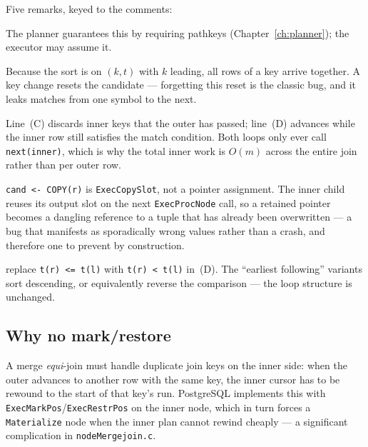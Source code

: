 \documentclass[11pt,a4paper]{report}
\theoremstyle{definition}
\theoremstyle{plain}
\newcommand{\code}[1]{\texttt{\small #1}}
\newcommand{\file}[1]{\texttt{\footnotesize #1}}
\begin{document}
Five remarks, keyed to the comments:

\begin{description}[leftmargin=*,font=\normalfont\bfseries]
\item[(A) Both sides are sorted.] The planner guarantees this by requiring pathkeys
      (Chapter~\ref{ch:planner}); the executor may assume it.
\item[(B) Key groups are contiguous.] Because the sort is on $(k, t)$ with $k$ leading, all
      rows of a key arrive together. A key change resets the candidate --- forgetting this
      reset is the classic bug, and it leaks matches from one symbol to the next.
\item[(C) and (D) The inner cursor never rewinds.] Line~(C) discards inner keys that the
      outer has passed; line~(D) advances while the inner row still satisfies the match
      condition. Both loops only ever call \code{next(inner)}, which is why the total inner
      work is $O(m)$ across the entire join rather than per outer row.
\item[(E) The candidate must be \emph{copied}.] \code{cand <- COPY(r)} is
      \code{ExecCopySlot}, not a pointer assignment. The inner child reuses its output slot
      on the next \code{ExecProcNode} call, so a retained pointer becomes a dangling
      reference to a tuple that has already been overwritten --- a bug that manifests as
      sporadically wrong values rather than a crash, and therefore one to prevent by
      construction.
\item[Strict operators] replace \code{t(r) <= t(l)} with \code{t(r) < t(l)} in~(D).
      The ``earliest following'' variants sort descending, or equivalently reverse the
      comparison --- the loop structure is unchanged.
\end{description}

\subsection{Why no mark/restore}

A merge \emph{equi}-join must handle duplicate join keys on the inner side: when the outer
advances to another row with the same key, the inner cursor has to be rewound to the start
of that key's run. PostgreSQL implements this with \code{ExecMarkPos}/\code{ExecRestrPos}
on the inner node, which in turn forces a \code{Materialize} node when the inner plan cannot
rewind cheaply --- a significant complication in \file{nodeMergejoin.c}.
\end{document}
